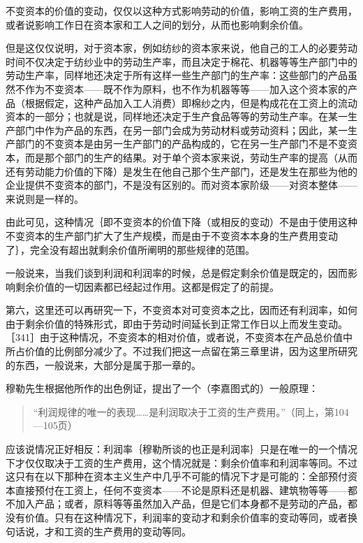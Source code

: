 不变资本的价值的变动，仅仅以这种方式影响劳动的价值，影响工资的生产费用，或者说影响工作日在资本家和工人之间的划分，从而也影响剩余价值。

但是这仅仅说明，对于资本家，例如纺纱的资本家来说，他自己的工人的必要劳动时间不仅决定于纺纱业中的劳动生产率，而且决定于棉花、机器等等生产部门中的劳动生产率，同样地还决定于所有这样一些生产部门的生产率：这些部门的产品虽然不作为不变资本——既不作为原料，也不作为机器等等——加入这个资本家的产品（根据假定，这种产品加入工人消费）即棉纱之内，但是构成花在工资上的流动资本的一部分；也就是说，同样地还决定于生产食品等等的劳动生产率。在某一生产部门中作为产品的东西，在另一部门会成为劳动材料或劳动资料；因此，某一生产部门的不变资本是由另一生产部门的产品构成的，它在另一生产部门不是不变资本，而是那个部门的生产的结果。对于单个资本家来说，劳动生产率的提高（从而还有劳动能力价值的下降）是发生在他自己那个生产部门，还是发生在那些为他的企业提供不变资本的部门，不是没有区别的。而对资本家阶级——对资本整体——来说则是一样的。

由此可见，这种情况｛即不变资本的价值下降（或相反的变动）不是由于使用这种不变资本的生产部门扩大了生产规模，而是由于不变资本本身的生产费用变动了｝，完全没有超出就剩余价值所阐明的那些规律的范围。

一般说来，当我们谈到利润和利润率的时候，总是假定剩余价值是既定的，因而影响剩余价值的一切因素都已经起过作用。这都是假定了的前提。


第六，这里还可以再研究一下，不变资本对可变资本之比，因而还有利润率，如何由于剩余价值的特殊形式，即由于劳动时间延长到正常工作日以上而发生变动。［341］由于这种情况，不变资本的相对价值，或者说，不变资本在产品总价值中所占价值的比例部分减少了。不过我们把这一点留在第三章里讲，因为这里所研究的东西，一般说来，大部分是属于那一章的。


穆勒先生根据他所作的出色例证，提出了一个（李嘉图式的）一般原理：

\begin{quote}{“利润规律的唯一的表现……是利润取决于工资的生产费用。”（同上，第104—105页）}\end{quote}

应该说情况正好相反：利润率｛穆勒所谈的也正是利润率｝只是在唯一的一个情况下才仅仅取决于工资的生产费用，这个情况就是：剩余价值率和利润率等同。不过这只有在以下那种在资本主义生产中几乎不可能的情况下才是可能的：全部预付资本直接预付在工资上，任何不变资本——不论是原料还是机器、建筑物等等——都不加入产品；或者，原料等等虽然加入产品，但是它们本身都不是劳动的产品，都没有价值。只有在这种情况下，利润率的变动才和剩余价值率的变动等同，或者换句话说，才和工资的生产费用的变动等同。

